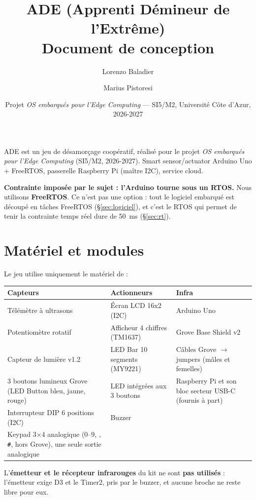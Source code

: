 \documentclass[11pt,a4paper]{article}
\title{\textbf{ADE (Apprenti Démineur de l'Extrême)}\\[4pt]\large Document de conception}
\author{Lorenzo Baladier \and Marius Pistoresi}
\date{Projet \emph{OS embarqués pour l'Edge Computing} --- SI5/M2, Université Côte d'Azur, 2026-2027}
\newcommand{\code}[1]{\texttt{\detokenize{#1}}}
\begin{document}
\maketitle

ADE est un jeu de désamorçage coopératif, réalisé pour le projet \emph{OS embarqués pour l'Edge Computing} (SI5/M2, 2026-2027).
Smart sensor/actuator Arduino Uno + FreeRTOS, passerelle Raspberry Pi (maître I2C), service cloud.

\textbf{Contrainte imposée par le sujet : l'Arduino tourne sous un RTOS.} Nous utilisons \textbf{FreeRTOS}. Ce n'est pas une option : tout le logiciel embarqué est découpé en tâches FreeRTOS (\S\ref{sec:logiciel}), et c'est le RTOS qui permet de tenir la contrainte temps réel dure de 50~ms (\S\ref{sec:rt}).

\tableofcontents

\setcounter{section}{-1}
\section{Matériel et modules}
\label{sec:avant}

Le jeu utilise uniquement le matériel de \code{components.txt} :

\begin{center}\small
\begin{tabularx}{\linewidth}{LLL}
\toprule
\textbf{Capteurs} & \textbf{Actionneurs} & \textbf{Infra} \\
\midrule
Télémètre à ultrasons & Écran LCD 16x2 (I2C) & Arduino Uno \\
Potentiomètre rotatif & Afficheur 4 chiffres (TM1637) & Grove Base Shield v2 \\
Capteur de lumière v1.2 & LED Bar 10 segments (MY9221) & Câbles Grove $\to$ jumpers (mâles et femelles) \\
3 boutons lumineux Grove (LED Button bleu, jaune, rouge) & LED intégrées aux 3 boutons & Raspberry Pi et son bloc secteur USB-C (fournis à part) \\
Interrupteur DIP 6 positions (I2C) & Buzzer & \\
Keypad 3×4 analogique (0--9, \code{*}, \texttt{\#}, hors Grove), une seule sortie analogique & & \\
\bottomrule
\end{tabularx}
\end{center}

L'\textbf{émetteur et le récepteur infrarouges} du kit ne sont \textbf{pas utilisés} : l'émetteur exige D3 et le Timer2, pris par le buzzer, et aucune broche ne reste libre pour eux.
\end{document}

